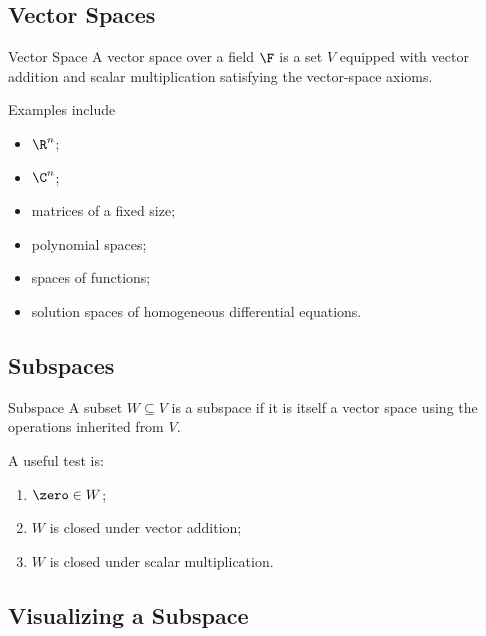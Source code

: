 \subsection{Vector Spaces}
\label{subsec:vector-spaces}

\begin{definitionbox}{Vector Space}
A vector space over a field \(\F\) is a set \(V\) equipped with vector addition
and scalar multiplication satisfying the vector-space axioms.
\end{definitionbox}

Examples include

\begin{itemize}
    \item \(\R^n\);
    \item \(\C^n\);
    \item matrices of a fixed size;
    \item polynomial spaces;
    \item spaces of functions;
    \item solution spaces of homogeneous differential equations.
\end{itemize}

\subsection{Subspaces}
\label{subsec:subspaces}

\begin{definitionbox}{Subspace}
A subset \(W\subseteq V\) is a subspace if it is itself a vector space using
the operations inherited from \(V\).
\end{definitionbox}

A useful test is:

\begin{enumerate}
    \item \(\zero\in W\);
    \item \(W\) is closed under vector addition;
    \item \(W\) is closed under scalar multiplication.
\end{enumerate}

\subsection{Visualizing a Subspace}
\label{subsec:visual-subspace}

